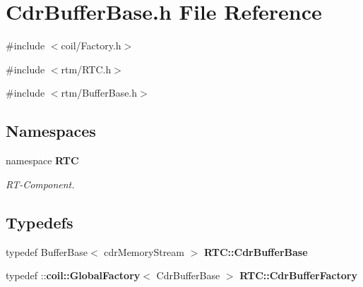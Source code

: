 \section{CdrBufferBase.h File Reference}
\label{CdrBufferBase_8h}
{\ttfamily \#include $<$coil/Factory.h$>$}\par
{\ttfamily \#include $<$rtm/RTC.h$>$}\par
{\ttfamily \#include $<$rtm/BufferBase.h$>$}\par
\subsection*{Namespaces}
\begin{DoxyCompactItemize}
\item 
namespace {\bf RTC}


\begin{DoxyCompactList}\small\item\em RT-\/Component. \item\end{DoxyCompactList}

\end{DoxyCompactItemize}
\subsection*{Typedefs}
\begin{DoxyCompactItemize}
\item 
typedef BufferBase$<$ cdrMemoryStream $>$ {\bf RTC::CdrBufferBase}
\item 
typedef ::{\bf coil::GlobalFactory}$<$ CdrBufferBase $>$ {\bf RTC::CdrBufferFactory}
\end{DoxyCompactItemize}
